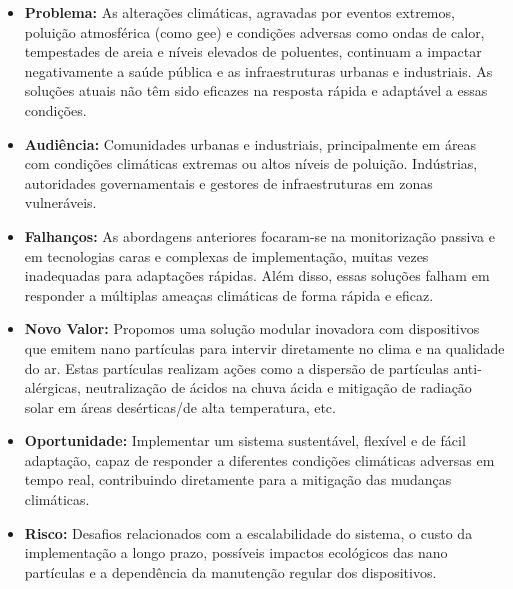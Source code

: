 \documentclass[a4paper, 11pt, onecolumn, oneside]{report}
\begin{document}
\begin{itemize}
    \item \textbf{Problema:} As alterações climáticas, agravadas por eventos extremos, poluição atmosférica (como \ac{gee}) e condições adversas como ondas de calor, tempestades de areia e níveis elevados de poluentes, continuam a impactar negativamente a saúde pública e as infraestruturas urbanas e industriais. As soluções atuais não têm sido eficazes na resposta rápida e adaptável a essas condições.
    \item \textbf{Audiência:} Comunidades urbanas e industriais, principalmente em áreas com condições climáticas extremas ou altos níveis de poluição. Indústrias, autoridades governamentais e gestores de infraestruturas em zonas vulneráveis.
    \item \textbf{Falhanços:} As abordagens anteriores focaram-se na monitorização passiva e em tecnologias caras e complexas de implementação, muitas vezes inadequadas para adaptações rápidas. Além disso, essas soluções falham em responder a múltiplas ameaças climáticas de forma rápida e eficaz.
    \item \textbf{Novo Valor:}  Propomos uma solução modular inovadora com dispositivos que emitem nano partículas para intervir diretamente no clima e na qualidade do ar. Estas partículas realizam ações como a dispersão de partículas anti-alérgicas, neutralização de ácidos na chuva ácida e mitigação de radiação solar em áreas desérticas/de alta temperatura, etc.
    \item \textbf{Oportunidade:} Implementar um sistema sustentável, flexível e de fácil adaptação, capaz de responder a diferentes condições climáticas adversas em tempo real, contribuindo diretamente para a mitigação das mudanças climáticas.
    \item \textbf{Risco:} Desafios relacionados com a escalabilidade do sistema, o custo da implementação a longo prazo, possíveis impactos ecológicos das nano partículas e a dependência da manutenção regular dos dispositivos.
\end{itemize}
\newpage
\end{document}
